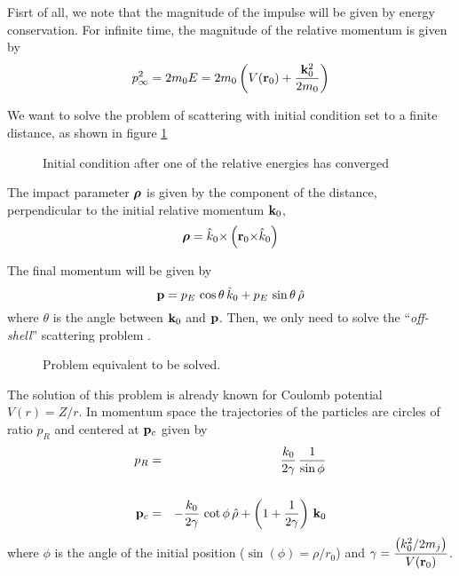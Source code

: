 Fisrt of all, we note that the magnitude of the impulse will be given by energy conservation. For infinite time, the magnitude of the relative momentum is given by
\begin{equation}
  \label{Q:ctmc_magnitude}
p_{\infty}^{2}= 2 m_{0} E = 2 m_{0} \left(V(\mathbf{r}_{0}) + \frac{\mathbf{k}^{2}_{0}}{2 m_{0}}  \right)
\end{equation}

We want to solve the problem of scattering with initial condition set
to a finite distance, as shown in figure \ref{f:cond-in}

\begin{figure}[h]\label{f:cond-in}
\centering
\caption{Initial condition after one of the relative energies has
converged}
\end{figure}


The impact parameter $\boldsymbol{\rho}$ is given by the component of the distance,
perpendicular to the initial relative momentum $\mathbf{k}_{0}$,
\begin{equation}\label{Q:rho}
\boldsymbol{\rho} = \hat{k}_{0} {\times} \left( \mathbf{r}_{0} {\times} \hat{k}_{0} \right)
\end{equation}

The final momentum will be given by
\begin{equation}\label{Q:finalmom}
\mathbf{p} = p_{E} \, \cos{\theta} \, \hat{k}_{0}+ p_{E}\, \sin{\theta}\,
\hat{\rho}
\end{equation}
%
where $\theta $ is the angle between $\mathbf{k}_{0}$ and $\mathbf{p}$. Then,
we only need to solve the ``\textit{off-shell}'' scattering problem
\cite{Fiol2000JPBp2847}.

\begin{figure}[!htpb]
  \centering
  \caption{Problem equivalent to be solved.
  \label{f:ctmc1}}
\end{figure}


The solution of this problem is already known for Coulomb potential
$V(r) = Z/r$. In momentum space the trajectories of the particles are
circles of ratio $p_{R}$ and centered at $\mathbf{p}_{c}$ given by
\begin{eqnarray}\label{Q:circle-mom}
p_{R} &=& \frac{k_{0}}{2 \gamma} \, \frac{1}{\sin{\phi}} \nonumber \\
\\
\mathbf{p}_{c} &=& - \frac{k_{0}}{2 \gamma } \, \cot{\phi}\, \hat{\rho} +
\left( 1 + \frac{1}{2 \gamma} \right) \, \mathbf{k}_{0} \nonumber
\end{eqnarray}
where $\phi$ is the angle of the initial position ($\sin(\phi) =
\rho/r_{0}$) and $\displaystyle{\gamma = \frac{\left( k_{0}^{2}/2 m_{j}
\right)}{V(\mathbf{r}_{0})}}$.

